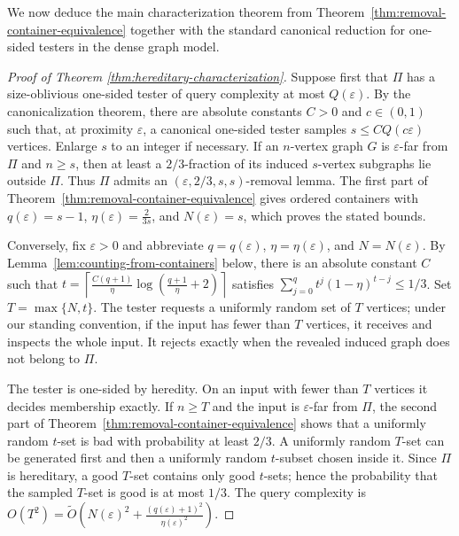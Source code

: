 \documentclass[11pt,reqno,letterpaper]{amsart}
\theoremstyle{plain}
\theoremstyle{remark}
\begin{document}
We now deduce the main characterization theorem from Theorem~\ref{thm:removal-container-equivalence} together with the standard canonical reduction for one-sided testers in the dense graph model.

\begin{proof}[Proof of Theorem \ref{thm:hereditary-characterization}]
Suppose first that $\Pi$ has a size-oblivious one-sided tester of query
complexity at most $Q(\varepsilon)$.  By the canonicalization theorem, there
are absolute constants $C>0$ and $c\in(0,1)$ such that, at proximity
$\varepsilon$, a canonical one-sided tester samples
$s\leq C Q(c\varepsilon)$ vertices.  Enlarge $s$ to an integer if necessary.
If an $n$-vertex graph $G$ is $\varepsilon$-far from $\Pi$ and $n\geq s$,
then at least a $2/3$-fraction of its induced $s$-vertex subgraphs lie outside
$\Pi$.  Thus $\Pi$ admits an $(\varepsilon,2/3,s,s)$-removal lemma.  The first
part of Theorem~\ref{thm:removal-container-equivalence} gives ordered
containers with
\(q(\varepsilon)=s-1\),
\(\eta(\varepsilon)=\frac{2}{3s}\),
and \(N(\varepsilon)=s\), which proves the stated bounds.

Conversely, fix $\varepsilon>0$ and abbreviate
$q=q(\varepsilon)$, $\eta=\eta(\varepsilon)$, and $N=N(\varepsilon)$.  By
Lemma~\ref{lem:counting-from-containers} below, there is an absolute constant
$C$ such that
\(t=\left\lceil \frac{C(q+1)}{\eta} \log\left(\frac{q+1}{\eta}+2\right) \right\rceil\)
satisfies
\(\sum_{j=0}^{q}t^j(1-\eta)^{t-j}\leq1/3\).
Set $T=\max\{N,t\}$.  The tester requests a uniformly random set of $T$
vertices; under our standing convention, if the input has fewer than $T$
vertices, it receives and inspects the whole input.  It rejects exactly when
the revealed induced graph does not belong to $\Pi$.

The tester is one-sided by heredity.  On an input with fewer than $T$ vertices
it decides membership exactly.  If $n\geq T$ and the input is
$\varepsilon$-far from $\Pi$, the second part of
Theorem~\ref{thm:removal-container-equivalence} shows that a uniformly random
$t$-set is bad with probability at least $2/3$.  A uniformly random $T$-set
can be generated first and then a uniformly random $t$-subset chosen inside
it.  Since $\Pi$ is hereditary, a good $T$-set contains only good $t$-sets;
hence the probability that the sampled $T$-set is good is at most $1/3$.
The query complexity is
\(O(T^2) =\widetilde O\!\left( N(\varepsilon)^2+ \frac{(q(\varepsilon)+1)^2}{\eta(\varepsilon)^2} \right).\)
\end{proof}
\end{document}
